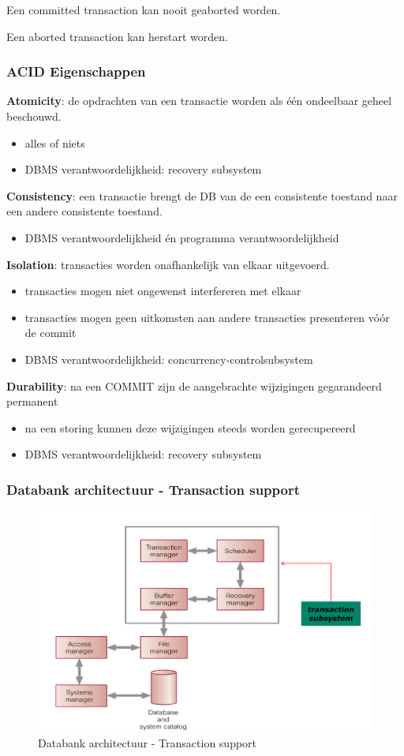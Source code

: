 \documentclass[a4paper,12pt]{article}
\begin{document}
Een committed transaction kan nooit geaborted worden.

Een aborted transaction kan herstart worden.

\subsubsection{ACID Eigenschappen}
\textbf{Atomicity}: de opdrachten van een transactie worden als één ondeelbaar geheel beschouwd.
\begin{itemize}
\item alles of niets
\item DBMS verantwoordelijkheid: recovery subsystem
\end{itemize}

\textbf{Consistency}: een transactie brengt de DB van de een consistente toestand naar een andere consistente toestand.
\begin{itemize}
\item DBMS verantwoordelijkheid én programma verantwoordelijkheid
\end{itemize}

\textbf{Isolation}: transacties worden onafhankelijk van elkaar uitgevoerd.
\begin{itemize}
\item transacties mogen niet ongewenst interfereren met elkaar
\item transacties mogen geen uitkomsten aan andere transacties presenteren vóór de commit
\item DBMS verantwoordelijkheid: concurrency-controlsubsystem
\end{itemize}

\textbf{Durability}: na een COMMIT zijn de aangebrachte wijzigingen gegarandeerd permanent
\begin{itemize}
\item na een storing kunnen deze wijzigingen steeds worden gerecupereerd
\item DBMS verantwoordelijkheid: recovery subsystem
\end{itemize}

\subsubsection{Databank architectuur - Transaction support}
\begin{figure}[H]
\centering
  	\includegraphics[width=.65\linewidth]{img/databankArchitectuur.png}
  	\caption{Databank architectuur - Transaction support}
  	\label{fig:DatabankArchitectuur}
\end{figure}
\end{document}
